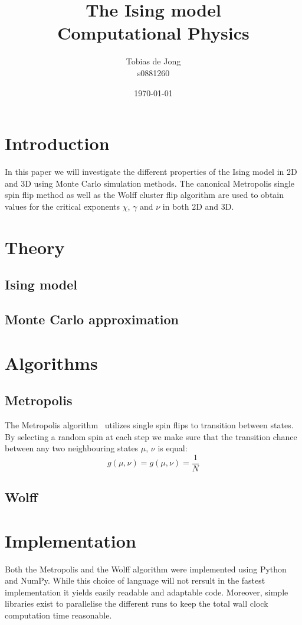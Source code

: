 \documentclass[11pt,twocolumn]{article}
\begin{document}
\title{The Ising model\\ Computational Physics}
\author{Tobias de Jong\\ s0881260}
\date{\today} %

\maketitle
\newcommand{\Part}[3][ ]{\ensuremath{\frac{\partial^{#1} #2}{{\partial #3}^{#1}}}}
\newcommand{\Dif}[3][ ]{\ensuremath{\frac{d^{#1} #2}{{d #3}^{#1}}}}
\renewcommand{\O}[1]{\ensuremath{\mathcal{O}\left(#1\right)}}
\renewcommand{\vec}{\bold}
\section{Introduction}
In this paper we will investigate the different properties of the Ising model in 2D and 3D using Monte Carlo simulation methods. The canonical Metropolis single spin flip method as well as the Wolff cluster flip algorithm are used to obtain values for the critical exponents $\chi$, $\gamma$ and $\nu$ in both 2D and 3D. %
\section{Theory}
\subsection{Ising model}
\subsection{Monte Carlo approximation}
\section{Algorithms}
\subsection{Metropolis}
The Metropolis algorithm~\cite{Metropolis} utilizes single spin flips to transition between states. By selecting a random spin at each step we make sure that the transition chance  between any two neighbouring states $\mu$, $\nu$ is equal:
\[g(\mu,\nu) = g(\mu,\nu) = \frac1N\]
\subsection{Wolff}
\section{Implementation}
Both the Metropolis and the Wolff algorithm were implemented using Python and NumPy. While this choice of language will not rersult in the fastest implementation it yields easily readable and adaptable code. Moreover, simple libraries exist to parallelise the different runs to keep the total wall clock computation time reasonable.
\end{document}
